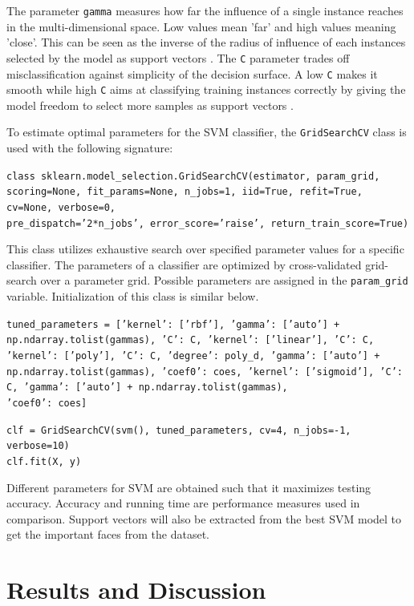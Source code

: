 \documentclass[11pt,a4paper]{article}
\begin{document}
	The parameter \texttt{gamma} measures how far the influence of a single instance reaches in the multi-dimensional space. Low values mean 'far' and high values meaning 'close'. This can be seen as the inverse of the radius of influence of each instances selected by the model as support vectors \cite{bib:hyp}. The \texttt{C} parameter trades off misclassification against simplicity of the decision surface. A low \texttt{C} makes it smooth while high \texttt{C} aims at classifying training instances correctly by giving the model freedom to select more samples as support vectors \cite{bib:hyp}.
	
	To estimate optimal parameters for the SVM classifier, the \texttt{GridSearchCV} class is used with the following signature:
	
	\texttt{class sklearn.model\_selection.GridSearchCV(estimator, param\_grid, scoring=None, fit\_params=None, n\_jobs=1, iid=True, refit=True, cv=None, verbose=0,\\ pre\_dispatch='2*n\_jobs', error\_score='raise', return\_train\_score=True)}
	
	This class utilizes exhaustive search over specified parameter values for a specific classifier. The parameters of a classifier are optimized by cross-validated grid-search over a parameter grid. Possible parameters are assigned in the \texttt{param\_grid} variable. Initialization of this class is similar below.
	
	\texttt{tuned\_parameters = [{'kernel': ['rbf'], 'gamma': ['auto'] +\\ np.ndarray.tolist(gammas), 'C': C},
		{'kernel': ['linear'], 'C': C},
		{'kernel': ['poly'], 'C': C, 'degree': poly\_d, 'gamma': ['auto'] +\\ np.ndarray.tolist(gammas), 'coef0': coes},
		{'kernel': ['sigmoid'], 'C': C, 'gamma': ['auto'] + np.ndarray.tolist(gammas),\\ 'coef0': coes}]}
	
	\texttt{clf = GridSearchCV(svm(), tuned\_parameters, cv=4, n\_jobs=-1, verbose=10)\\
		clf.fit(X, y)}
	
	Different parameters for SVM are obtained such that it maximizes testing accuracy. Accuracy and running time are performance measures used in comparison. Support vectors will also be extracted from the best SVM model to get the important faces from the dataset.
	
	\section{Results and Discussion}
	
\end{document}

